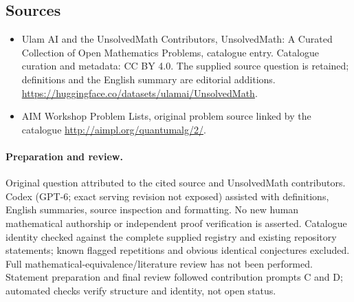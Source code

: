 \documentclass[11pt]{article}
\begin{document}
\subsection{Sources}
\begin{itemize}
\item[\hypertarget{source:statement:1}{S1}] Ulam AI and the UnsolvedMath Contributors, UnsolvedMath: A Curated Collection of Open Mathematics Problems, catalogue entry. Catalogue curation and metadata: CC BY 4.0. The supplied source question is retained; definitions and the English summary are editorial additions.
\url{https://huggingface.co/datasets/ulamai/UnsolvedMath}.
\item[\hypertarget{source:statement:2}{S2}] AIM Workshop Problem Lists, original problem source linked by the catalogue
\url{http://aimpl.org/quantumalg/2/}.
\end{itemize}
\paragraph{Preparation and review.}
Original question attributed to the cited source and UnsolvedMath contributors. Codex (GPT-6; exact serving revision not exposed) assisted with definitions, English summaries, source inspection and formatting. No new human mathematical authorship or independent proof verification is asserted. Catalogue identity checked against the complete supplied registry and existing repository statements; known flagged repetitions and obvious identical conjectures excluded. Full mathematical-equivalence/literature review has not been performed. Statement preparation and final review followed contribution prompts C and D; automated checks verify structure and identity, not open status.
\label{end:statement}
\end{document}
